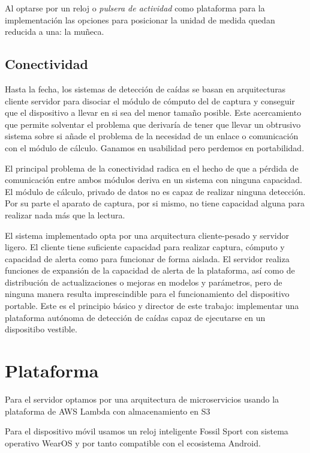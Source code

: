 Al optarse por un reloj o \textit{pulsera de actividad} como plataforma para la implementación las opciones para posicionar la unidad de medida quedan reducida a una: la muñeca.

\subsection{Conectividad}

Hasta la fecha, los sistemas de detección de caídas se basan en arquitecturas cliente servidor para disociar el módulo de cómputo del de captura y conseguir que el dispositivo a llevar en si sea del menor tamaño posible. Este acercamiento que permite solventar el problema que derivaría de tener que llevar un obtrusivo sistema sobre si añade el problema de la necesidad de un enlace o comunicación con el módulo de cálculo. Ganamos en usabilidad pero perdemos en portabilidad.

El principal problema de la conectividad radica en el hecho de que a pérdida de comunicación entre ambos módulos deriva en un sistema con ninguna capacidad. El módulo de cálculo, privado de datos no es capaz de realizar ninguna detección. Por su parte el aparato de captura, por si mismo, no tiene capacidad alguna para realizar nada más que la lectura.

El sistema implementado opta por una arquitectura cliente-pesado y servidor ligero. El cliente tiene suficiente capacidad para realizar captura, cómputo y capacidad de alerta como para funcionar de forma aislada. El servidor realiza funciones de expansión de la capacidad de alerta de la plataforma, así como de distribución de actualizaciones o mejoras en modelos y parámetros, pero de ninguna manera resulta imprescindible para el funcionamiento del dispositivo portable. Este es el principio básico y director de este trabajo: implementar una plataforma autónoma de detección de caídas capaz de ejecutarse en un dispositibo vestible.


\section{Plataforma}
Para el servidor optamos por una arquitectura de microservicios usando la plataforma de AWS Lambda con almacenamiento en S3

Para el dispositivo móvil usamos un reloj inteligente Fossil Sport con sistema operativo WearOS y por tanto compatible con el ecosistema Android.

